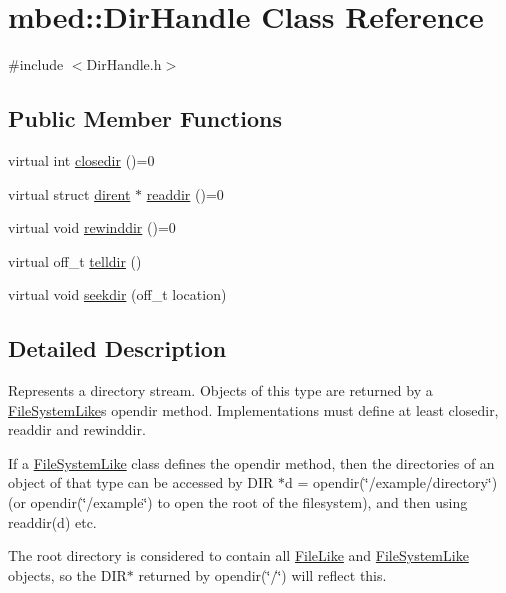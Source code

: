 \hypertarget{classmbed_1_1_dir_handle}{}\section{mbed\+:\+:Dir\+Handle Class Reference}
\label{classmbed_1_1_dir_handle}


{\ttfamily \#include $<$Dir\+Handle.\+h$>$}

\subsection*{Public Member Functions}
\begin{DoxyCompactItemize}
\item 
virtual int \hyperlink{classmbed_1_1_dir_handle_a4c26b9d7fc438b1f7d9b01ced8629f6e}{closedir} ()=0
\item 
virtual struct \hyperlink{structdirent}{dirent} $\ast$ \hyperlink{classmbed_1_1_dir_handle_a5d90793d31cb04ccc3105922a68b147f}{readdir} ()=0
\item 
virtual void \hyperlink{classmbed_1_1_dir_handle_af21ed332757da752a1286e1a0189957a}{rewinddir} ()=0
\item 
virtual off\+\_\+t \hyperlink{classmbed_1_1_dir_handle_a6b509a9d24905b38e3883e998de13ae1}{telldir} ()
\item 
virtual void \hyperlink{classmbed_1_1_dir_handle_a5f4511c471648633570515cc9ff9e9e5}{seekdir} (off\+\_\+t location)
\end{DoxyCompactItemize}


\subsection{Detailed Description}
Represents a directory stream. Objects of this type are returned by a \hyperlink{classmbed_1_1_file_system_like}{File\+System\+Like}\textquotesingle{}s opendir method. Implementations must define at least closedir, readdir and rewinddir.

If a \hyperlink{classmbed_1_1_file_system_like}{File\+System\+Like} class defines the opendir method, then the directories of an object of that type can be accessed by D\+IR $\ast$d = opendir(\char`\"{}/example/directory\char`\"{}) (or opendir(\char`\"{}/example\char`\"{}) to open the root of the filesystem), and then using readdir(d) etc.

The root directory is considered to contain all \hyperlink{classmbed_1_1_file_like}{File\+Like} and \hyperlink{classmbed_1_1_file_system_like}{File\+System\+Like} objects, so the D\+I\+R$\ast$ returned by opendir(\char`\"{}/\char`\"{}) will reflect this. 

